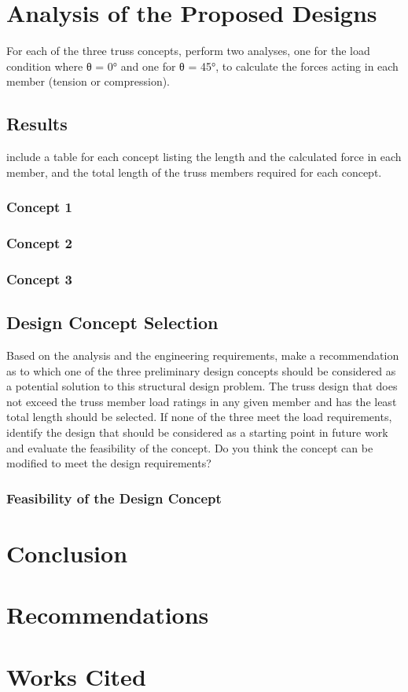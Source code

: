 \chapter{Analysis of the Proposed Designs}
For each of the three truss concepts, perform two analyses, one for the load condition where θ = 0° and one for θ = 45°, to calculate the forces acting in each member (tension or compression).
\section{Results}
include a table for each concept listing the length and the calculated force in each member, and the total length of the truss members required for each concept.
\subsection{Concept 1}
\subsection{Concept 2}
\subsection{Concept 3}

\section{Design Concept Selection}
Based on the analysis and the engineering requirements, make a recommendation as to which one of the three preliminary design concepts should be considered as a potential solution to this structural design problem. The truss design that does not exceed the truss member load ratings in any given member and has the least total length should be selected. If none of the three meet the load requirements, identify the design that should be considered as a starting point in future work and evaluate the feasibility of the concept. Do you think the concept can be modified to meet the design requirements?
\subsection{Feasibility of the Design Concept}

\chapter{Conclusion}

\chapter{Recommendations}

\chapter{Works Cited}
